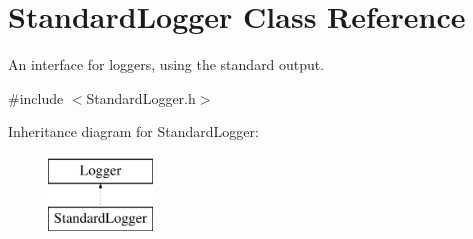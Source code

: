 \hypertarget{class_standard_logger}{}\section{Standard\+Logger Class Reference}
\label{class_standard_logger}


An interface for loggers, using the standard output.  




{\ttfamily \#include $<$Standard\+Logger.\+h$>$}

Inheritance diagram for Standard\+Logger\+:\begin{figure}[H]
\begin{center}
\leavevmode
\includegraphics[height=2.000000cm]{class_standard_logger}
\end{center}
\end{figure}

